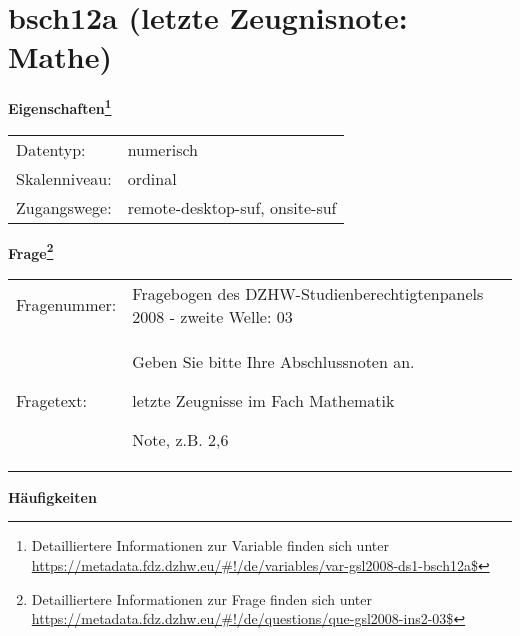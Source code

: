 
    \setcounter{footnote}{0}

    \vspace*{-1.8cm}
	\section{bsch12a (letzte Zeugnisnote: Mathe)}
	\label{section:bsch12a}



    \vspace*{0.5cm}
    \noindent\textbf{Eigenschaften\footnote{Detailliertere Informationen zur Variable finden sich unter
		\url{https://metadata.fdz.dzhw.eu/\#!/de/variables/var-gsl2008-ds1-bsch12a$}}}\\
	\begin{tabularx}{\hsize}{@{}lX}
	Datentyp: & numerisch \\
	Skalenniveau: & ordinal \\
	Zugangswege: &
	  remote-desktop-suf, 
	  onsite-suf
 \\
    \end{tabularx}



				\vspace*{0.5cm}
                \noindent\textbf{Frage\footnote{Detailliertere Informationen zur Frage finden sich unter
		              \url{https://metadata.fdz.dzhw.eu/\#!/de/questions/que-gsl2008-ins2-03$}}}\\
				\begin{tabularx}{\hsize}{@{}lX}
					Fragenummer: &
					  Fragebogen des DZHW-Studienberechtigtenpanels 2008 - zweite Welle:
					  03
 \\
					Fragetext: & Geben Sie bitte Ihre Abschlussnoten an.\par  letzte Zeugnisse im Fach Mathematik\par  Note, z.B. 2,6 \\
				\end{tabularx}





        		\vspace*{0.5cm}
                \noindent\textbf{Häufigkeiten}

